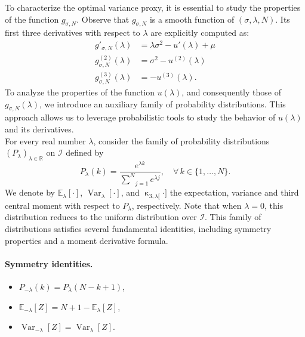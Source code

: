 \documentclass[a4paper, 10pt]{article}
\newcommand{\beq}{\begin{equation}}
\newcommand{\eeq}{\end{equation}}
\theoremstyle{definition}
\begin{document}
To characterize the optimal variance proxy, it is essential to study the properties of the function $g_{\sigma, N}$. Observe that $g_{\sigma, N}$ is a smooth function of $(\sigma, \lambda, N)$. Its first three derivatives with respect to $\lambda$ are explicitly computed as:
\begin{align*}
g'_{\sigma,N}(\lambda)   &= \lambda \sigma^2 - u'(\lambda) + \mu \\
g^{(2)}_{\sigma,N}(\lambda) &= \sigma^2 - u^{(2)}(\lambda)\\
g^{(3)}_{\sigma,N}(\lambda) &= - u^{(3)}(\lambda).
\end{align*}
To analyze the properties of the function \( u(\lambda) \), and consequently those of \( g_{\sigma,N}(\lambda) \), we introduce an auxiliary family of probability distributions. This approach allows us to leverage probabilistic tools to study the behavior of \( u(\lambda) \) and its derivatives.\\
For every real number \( \lambda \), consider the family of probability distributions \( (P_\lambda)_{\lambda \in \mathbb{R}} \) on \( \mathcal{I} \) defined by
\beq
P_\lambda(k) = \frac{e^{\lambda k}}{\underset{j=1}{\overset{N}{\sum}}e^{\lambda j}}, \quad \forall \, k\in \{1,\dots,N\}.
\eeq
We denote by \( \mathbb{E}_\lambda[\cdot] \), \( \operatorname{Var}_\lambda[\cdot] \), and \( \operatorname{\kappa}_{3,\lambda[}\cdot] \) the expectation, variance and  third central moment with respect to \( P_\lambda \), respectively. Note that when \( \lambda = 0 \), this distribution reduces to the uniform distribution over \( \mathcal{I} \).
This family of distributions satisfies several fundamental identities, including symmetry properties and a moment derivative formula.
\paragraph{Symmetry identities.}
    \begin{itemize}
        \item \( P_{-\lambda}(k) = P_\lambda(N - k + 1) \),
        \item \( \mathbb{E}_{-\lambda}[Z] = N + 1 - \mathbb{E}_\lambda[Z] \),
        \item \( \operatorname{Var}_{-\lambda}[Z] = \operatorname{Var}_\lambda[Z] \).
    \end{itemize}
\end{document}

